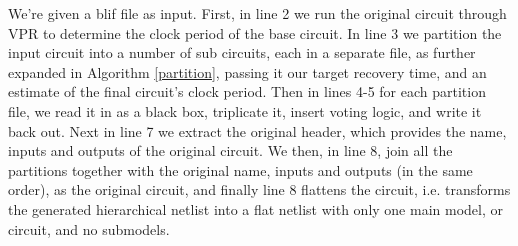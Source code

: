 \documentclass[12pt,final,oneside]{dwThesis} %
\begin{document}
   We're given a blif file as input.
   First, in line 2 we run the original circuit through \gls{VPR} to determine the clock period of the base circuit.
   In line 3 we partition the input circuit into a number of sub circuits, each in a separate file, as
   further expanded in Algorithm \ref{partition}, passing it our target recovery time, and an estimate of the final circuit's clock period.
   Then in lines 4-5 for each
   partition file, we read it in as a black box, triplicate it, insert voting
   logic, and write it back out.  Next in line 7 we extract the original
   header, which provides the name, inputs and outputs of the original circuit.
   We then, in line 8, join all the partitions together with the original name,
   inputs and outputs (in the same order), as the original circuit, and finally
   line 8 flattens the circuit, i.e. transforms the generated hierarchical
   netlist into a flat netlist with only one main model, or circuit, and no
   submodels.

   \newpage 
\end{document}
